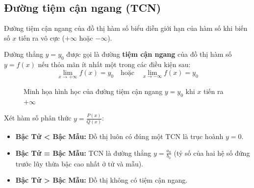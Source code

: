 \documentclass[12pt]{article}
\begin{document}
	\subsection{Đường tiệm cận ngang (TCN)}
	
	Đường tiệm cận ngang của đồ thị hàm số biểu diễn giới hạn của hàm số khi biến số $x$ tiến ra vô cực ($+\infty$ hoặc $-\infty$).
	
	\begin{phuongphap}
		Đường thẳng $y = y_0$ được gọi là đường \textbf{tiệm cận ngang} của đồ thị hàm số $y = f(x)$ nếu thỏa mãn ít nhất một trong các điều kiện sau:
		\[ \lim_{x \to +\infty} f(x) = y_0 \quad \text{hoặc} \quad \lim_{x \to -\infty} f(x) = y_0 \]
	\end{phuongphap}
	
	\begin{figure}[H]
		\centering
		\caption{Minh họa hình học của đường tiệm cận ngang $y = y_0$ khi $x$ tiến ra $+\infty$}
	\end{figure}
	
	\begin{phuongphap}
		Xét hàm số phân thức $y = \frac{P(x)}{Q(x)}$:
		\begin{itemize}
			\item \textbf{Bậc Tử < Bậc Mẫu:} Đồ thị luôn có đúng một TCN là trục hoành $y = 0$.
			\item \textbf{Bậc Tử = Bậc Mẫu:} TCN là đường thẳng $y = \frac{a_0}{b_0}$ (tỷ số của hai hệ số đứng trước lũy thừa bậc cao nhất ở tử và mẫu).
			\item \textbf{Bậc Tử > Bậc Mẫu:} Đồ thị không có tiệm cận ngang.
		\end{itemize}
	\end{phuongphap}
	
\end{document}
